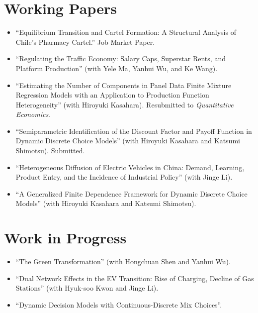 \documentclass[11pt]{article}
\begin{document}
\section*{Working Papers}
\begin{itemize}[leftmargin=*,itemsep=0pt,parsep=0pt,topsep=1pt]
  \item ``Equilibrium Transition and Cartel Formation: A Structural Analysis of Chile's Pharmacy Cartel.'' Job Market Paper.
  \item ``Regulating the Traffic Economy: Salary Caps, Superstar Rents, and Platform Production'' (with Yele Ma, Yanhui Wu, and Ke Wang).
  \item ``Estimating the Number of Components in Panel Data Finite Mixture Regression Models with an Application to Production Function Heterogeneity'' (with Hiroyuki Kasahara). Resubmitted to \textit{Quantitative Economics}.
  \item ``Semiparametric Identification of the Discount Factor and Payoff Function in Dynamic Discrete Choice Models'' (with Hiroyuki Kasahara and Katsumi Shimotsu). Submitted.
  \item ``Heterogeneous Diffusion of Electric Vehicles in China: Demand, Learning, Product Entry, and the Incidence of Industrial Policy'' (with Jinge Li).
  \item ``A Generalized Finite Dependence Framework for Dynamic Discrete Choice Models'' (with Hiroyuki Kasahara and Katsumi Shimotsu).
\end{itemize}

\section*{Work in Progress}
\begin{itemize}[leftmargin=*,itemsep=0pt,parsep=0pt,topsep=1pt]
  \item ``The Green Transformation'' (with Hongchuan Shen and Yanhui Wu).

  \item ``Dual Network Effects in the EV Transition: Rise of Charging, Decline of Gas Stations'' (with Hyuk-soo Kwon and Jinge Li).
  \item ``Dynamic Decision Models with Continuous-Discrete Mix Choices''.
\end{itemize}
\end{document}
